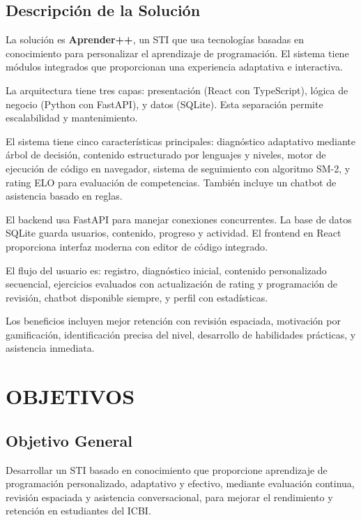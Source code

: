\documentclass[12pt,letterpaper]{article}
\begin{document}
\subsection{Descripción de la Solución}

La solución es \textbf{Aprender++}, un STI que usa tecnologías basadas en conocimiento para personalizar el aprendizaje de programación. El sistema tiene módulos integrados que proporcionan una experiencia adaptativa e interactiva.

La arquitectura tiene tres capas: presentación (React con TypeScript), lógica de negocio (Python con FastAPI), y datos (SQLite). Esta separación permite escalabilidad y mantenimiento.

El sistema tiene cinco características principales: diagnóstico adaptativo mediante árbol de decisión, contenido estructurado por lenguajes y niveles, motor de ejecución de código en navegador, sistema de seguimiento con algoritmo SM-2, y rating ELO para evaluación de competencias. También incluye un chatbot de asistencia basado en reglas.

El backend usa FastAPI para manejar conexiones concurrentes. La base de datos SQLite guarda usuarios, contenido, progreso y actividad. El frontend en React proporciona interfaz moderna con editor de código integrado.

El flujo del usuario es: registro, diagnóstico inicial, contenido personalizado secuencial, ejercicios evaluados con actualización de rating y programación de revisión, chatbot disponible siempre, y perfil con estadísticas.

Los beneficios incluyen mejor retención con revisión espaciada, motivación por gamificación, identificación precisa del nivel, desarrollo de habilidades prácticas, y asistencia inmediata.

\section{OBJETIVOS}

\subsection{Objetivo General}

Desarrollar un STI basado en conocimiento que proporcione aprendizaje de programación personalizado, adaptativo y efectivo, mediante evaluación continua, revisión espaciada y asistencia conversacional, para mejorar el rendimiento y retención en estudiantes del ICBI.
\end{document}
